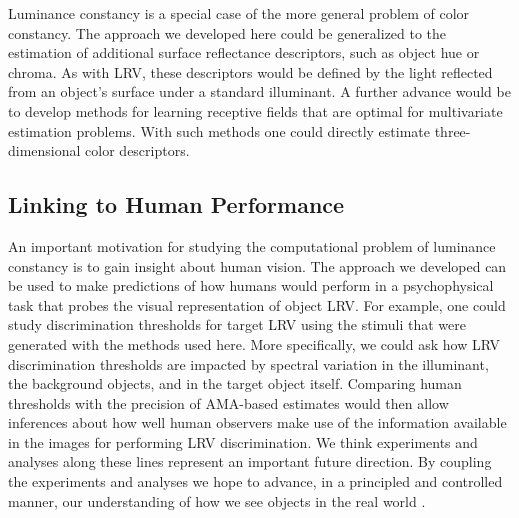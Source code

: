 \documentclass{jov}
\begin{document}
Luminance constancy is a special case of the more general problem of color constancy.
The approach we developed here could be generalized to the estimation of additional surface reflectance descriptors, such as object hue or chroma.
As with LRV, these descriptors would be defined by the light reflected from an object's surface under a standard illuminant.
A further advance would be to develop methods for learning receptive fields that are optimal for multivariate estimation problems. 
With such methods one could directly estimate three-dimensional color descriptors.

\subsection{Linking to Human Performance}

An important motivation for studying the computational problem of luminance constancy
is to gain insight about human vision.
The approach we developed can be used to make predictions of how humans would perform in a psychophysical task that probes the visual representation of object LRV.
For example, one could study discrimination thresholds for target LRV using the stimuli that were generated with the methods used here.
More specifically, we could ask how LRV discrimination thresholds are impacted by spectral variation in the illuminant, the background objects, and in the target object itself.
Comparing human thresholds with the precision of AMA-based estimates would then allow inferences about how well human observers make use of the information available in the images for performing LRV discrimination.
We think experiments and analyses along these lines represent an important future direction.
By coupling the experiments and analyses we hope to advance, in a principled and controlled manner, our understanding of how we see objects in the real world .



\end{document}
